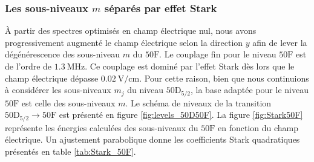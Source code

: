 \subsubsection*{Les sous-niveaux $m$ séparés par effet Stark}
\noindent \`A partir des spectres optimisés en champ électrique nul, nous avons progressivement augmenté le champ électrique selon la direction $y$ afin de lever la dégénérescence des sous-niveau $m$ du $\mathrm{50F}$.
Le couplage fin pour le niveau $\mathrm{50F}$ est de l'ordre de $\SI{1.3}{\MHz}$.
Ce couplage est dominé par l'effet Stark dès lors que le champ électrique dépasse $\SI{0.02}{\V/\cm}$.
Pour cette raison, bien que nous continuions à considérer les sous-niveaux $m_j$ du niveau $\mathrm{50D}_{5/2}$, la base adaptée pour le niveau $\mathrm{50F}$ est celle des sous-niveaux $m$.
Le schéma de niveaux de la transition $\mathrm{50D}_{5/2}\rightarrow\mathrm{50F}$ est présenté en figure \eqref{fig:levels_50D50F}.
La figure \eqref{fig:Stark50F} représente les énergies calculées des sous-niveaux du $\mathrm{50F}$ en fonction du champ électrique.
Un ajustement parabolique donne les coefficients Stark quadratiques présentés en table \eqref{tab:Stark_50F}.

